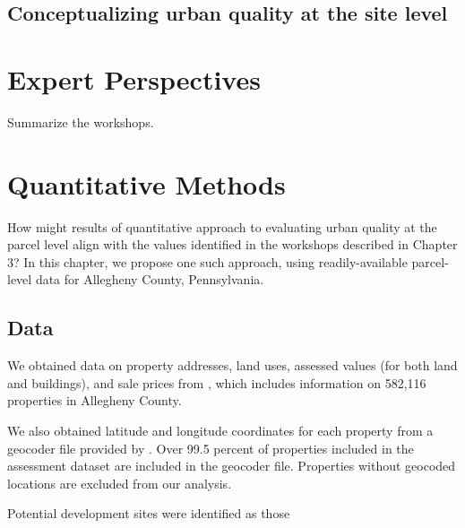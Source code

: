 \documentclass[
]{book}
\begin{document}
\hypertarget{conceptualizing-urban-quality-at-the-site-level}{%
\section{Conceptualizing urban quality at the site level}\label{conceptualizing-urban-quality-at-the-site-level}}

\hypertarget{expert-perspectives}{%
\chapter{Expert Perspectives}\label{expert-perspectives}}

Summarize the workshops.

\hypertarget{quantitative-methods}{%
\chapter{Quantitative Methods}\label{quantitative-methods}}

How might results of quantitative approach to evaluating urban quality at the
parcel level align with the values identified in the workshops described in
Chapter 3? In this chapter, we propose one such approach, using
readily-available parcel-level data for Allegheny County, Pennsylvania.

\hypertarget{data}{%
\section{Data}\label{data}}

We obtained data on property addresses, land uses, assessed values (for both
land and buildings), and sale prices
from \citet{allegheny_county_office_of_property_assessments_allegheny_2022}, which
includes information on 582,116 properties in Allegheny County.

We also obtained latitude and longitude coordinates for each property from a
geocoder file provided by \citet{western_pennsylvania_regional_data_center_geocoders_2021}.
Over 99.5 percent of properties included in the assessment dataset are included
in the geocoder file. Properties without geocoded locations are excluded from
our analysis.

Potential development sites were identified as those
\end{document}
